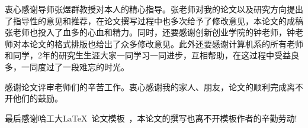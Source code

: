 \begin{acknowledgements}
衷心感谢导师张煜群教授对本人的精心指导。张老师对我的论文以及研究方向提出了指导性的意见和推荐，在论文撰写过程中也多次给予了修改意见，本论文的成稿张老师也投入了血多的心血和精力。同时，还要感谢创新创业学院的钟老师，钟老师对本论文的格式排版也给出了众多修改意见。此外还要感谢计算机系的所有老师和同学，2年的研究生生涯大家一同学习一同进步，互相帮助，在这过程中受益良多，一同度过了一段难忘的时光。

感谢论文评审老师们的辛苦工作。衷心感谢我的家人、朋友，论文的顺利完成离不开他们的鼓励。

最后感谢哈工大\LaTeX\ 论文模板\hithesis\ ，本论文的撰写也离不开模板作者的辛勤劳动!

\end{acknowledgements}
